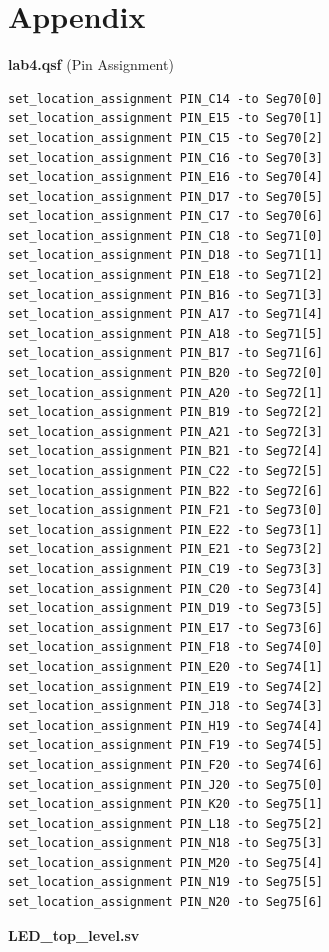 \documentclass[12pt]{article}
\begin{document}
\section*{Appendix} \label{section:Appendix}

\begin{center}
  \textbf{lab4.qsf} (Pin Assignment)
\end{center}

\begin{verbatim}
set_location_assignment PIN_C14 -to Seg70[0]
set_location_assignment PIN_E15 -to Seg70[1]
set_location_assignment PIN_C15 -to Seg70[2]
set_location_assignment PIN_C16 -to Seg70[3]
set_location_assignment PIN_E16 -to Seg70[4]
set_location_assignment PIN_D17 -to Seg70[5]
set_location_assignment PIN_C17 -to Seg70[6]
set_location_assignment PIN_C18 -to Seg71[0]
set_location_assignment PIN_D18 -to Seg71[1]
set_location_assignment PIN_E18 -to Seg71[2]
set_location_assignment PIN_B16 -to Seg71[3]
set_location_assignment PIN_A17 -to Seg71[4]
set_location_assignment PIN_A18 -to Seg71[5]
set_location_assignment PIN_B17 -to Seg71[6]
set_location_assignment PIN_B20 -to Seg72[0]
set_location_assignment PIN_A20 -to Seg72[1]
set_location_assignment PIN_B19 -to Seg72[2]
set_location_assignment PIN_A21 -to Seg72[3]
set_location_assignment PIN_B21 -to Seg72[4]
set_location_assignment PIN_C22 -to Seg72[5]
set_location_assignment PIN_B22 -to Seg72[6]
set_location_assignment PIN_F21 -to Seg73[0]
set_location_assignment PIN_E22 -to Seg73[1]
set_location_assignment PIN_E21 -to Seg73[2]
set_location_assignment PIN_C19 -to Seg73[3]
set_location_assignment PIN_C20 -to Seg73[4]
set_location_assignment PIN_D19 -to Seg73[5]
set_location_assignment PIN_E17 -to Seg73[6]
set_location_assignment PIN_F18 -to Seg74[0]
set_location_assignment PIN_E20 -to Seg74[1]
set_location_assignment PIN_E19 -to Seg74[2]
set_location_assignment PIN_J18 -to Seg74[3]
set_location_assignment PIN_H19 -to Seg74[4]
set_location_assignment PIN_F19 -to Seg74[5]
set_location_assignment PIN_F20 -to Seg74[6]
set_location_assignment PIN_J20 -to Seg75[0]
set_location_assignment PIN_K20 -to Seg75[1]
set_location_assignment PIN_L18 -to Seg75[2]
set_location_assignment PIN_N18 -to Seg75[3]
set_location_assignment PIN_M20 -to Seg75[4]
set_location_assignment PIN_N19 -to Seg75[5]
set_location_assignment PIN_N20 -to Seg75[6]
\end{verbatim}

\begin{center}
  \textbf{LED\_top\_level.sv}
\end{center}
\end{document}
